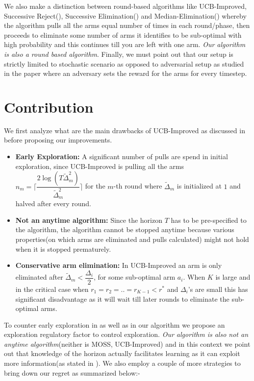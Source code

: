 	We also make a distinction between round-based algorithms like UCB-Improved, Successive Reject(\cite{audibert2010best}), Successive Elimination(\cite{even2006action}) and Median-Elimination(\cite{even2006action}) whereby the algorithm pulls all the arms equal number of times in each round/phase, then proceeds to eliminate some number of arms it identifies to be sub-optimal with high probability and this continues till you are left with one arm. \textit{Our algorithm is also a round based algorithm}. Finally, we must point out that our setup is strictly limited to stochastic scenario as opposed to adversarial setup as studied in the paper \cite{auer2002nonstochastic} where an adversary sets the reward for the arms for every timestep.
	
\section*{Contribution}

	We first analyze what are the main drawbacks of UCB-Improved as discussed in \cite{liu2016modification} before proposing our improvements. 
	
\begin{itemize}
\item \textbf{Early Exploration:} A significant number of pulls are spend in initial exploration, since UCB-Improved is pulling all the arms $n_{m}=\bigg\lceil \dfrac{ 2\log(T\tilde{\Delta}^{2}_{m})}{\tilde{\Delta}^{2}_{m}} \bigg\rceil$ for the $m$-th round where $\tilde{\Delta}_{m}$ is initialized at $1$ and halved after every round.
\item \textbf{Not an anytime algorithm:} Since the horizon $T$ has to be pre-specified to the algorithm, the algorithm cannot be stopped anytime because various properties(on which arms are eliminated and pulls calculated) might not hold when it is stopped prematurely.
\item \textbf{Conservative arm elimination:} In UCB-Improved an arm is only eliminated after $\tilde{\Delta}_{m}<\dfrac{\Delta_{i}}{2}$, for some sub-optimal arm $a_{i}$. When $K$ is large and in the critical case when $r_{1}=r_{2}=..=r_{K-1}<r^{*}$ and $\Delta_{i}$'s are small this has significant disadvantage as it will wait till later rounds to eliminate the sub-optimal arms.
\end{itemize}
	To counter early exploration in \cite{liu2016modification} as well as in our algorithm we propose an exploration regulatory factor to control exploration. \textit{Our algorithm is also not an anytime algorithm}(neither is MOSS, UCB-Improved) and in this context we point out that knowledge of the horizon actually facilitates learning as it can exploit more information(as stated in \cite{lattimore2015optimally}). We also employ a couple of more strategies to bring down our regret as summarized below:-
	
